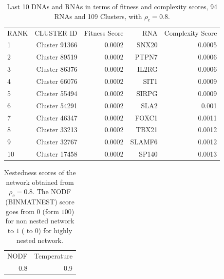 \documentclass[10pt,a4paper]{article}
\begin{document}
 \begin{table}[h!]
\centering
\caption{\label{tab:tab5} Last 10 DNAs and RNAs in terms of fitness and complexity scores, 94 RNAs and 109 Clusters, with $\rho_{c} = 0.8$.}
\begin{tabular}{l|rr|rr|}
\cline{1-5}
RANK & CLUSTER ID & Fitness Score & RNA & Complexity Score\\
\cline{1-5}
1 & Cluster 91366 & 0.0002 & SNX20 & 0.0005\\
2 & Cluster 89519 & 0.0002 & PTPN7 & 0.0006\\
3 & Cluster 86376 & 0.0002 & IL2RG & 0.0006\\
4 & Cluster 66076 & 0.0002 & SIT1 & 0.0009\\
5 & Cluster 55494 & 0.0002 & SIRPG & 0.0009\\
6 & Cluster 54291 & 0.0002 & SLA2 & 0.001\\
7 & Cluster 46347 & 0.0002 & FOXC1 & 0.0011\\
8 & Cluster 33213 & 0.0002 & TBX21 & 0.0012\\
9 & Cluster 32767 & 0.0002 & SLAMF6 & 0.0012\\
10 & Cluster 17458 & 0.0002 & SP140 & 0.0013\\
\cline{1-5}
\end{tabular}
\end{table}
\begin{table}[h!]
\centering
\caption{\label{tab:tab6}Nestedness scores of the network obtained from $\rho_{c} = 0.8$. The NODF (BINMATNEST) score goes from $0$ (form $100$) for non nested network to $1$ ( to $0$) for highly nested network.}
\begin{tabular}{|r|r|}
\cline{1-2}
NODF & Temperature\\
\cline{1-2}
0.8 & 0.9\\
\cline{1-2}
\end{tabular}
\end{table}
\clearpage
\printbibliography
\end{document}
